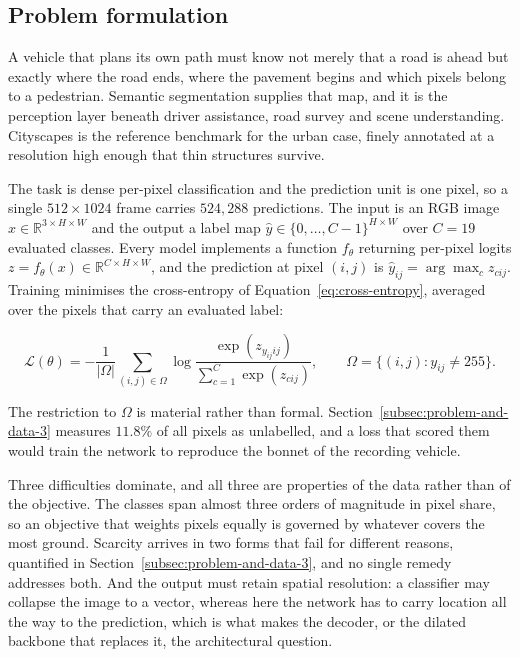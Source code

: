 
\subsection{Problem formulation}
\label{subsec:problem-and-data-1}

A vehicle that plans its own path must know not merely that a road is ahead but exactly where the
road ends, where the pavement begins and which pixels belong to a pedestrian. Semantic
segmentation supplies that map, and it is the perception layer beneath driver assistance, road
survey and scene understanding. Cityscapes \cite{cordts2016cityscapes} is the reference benchmark
for the urban case, finely annotated at a resolution high enough that thin structures survive.

The task is dense per-pixel classification and the prediction unit is one pixel, so a single
$512 \times 1024$ frame carries $524{,}288$ predictions. The input is an RGB image
$x \in \mathbb{R}^{3 \times H \times W}$ and the output a label map
$\hat{y} \in \{0, \dots, C-1\}^{H \times W}$ over $C = 19$ evaluated classes. Every model
implements a function $f_\theta$ returning per-pixel logits
$z = f_\theta(x) \in \mathbb{R}^{C \times H \times W}$, and the prediction at pixel $(i,j)$ is
$\hat{y}_{ij} = \arg\max_{c} z_{cij}$. Training minimises the cross-entropy of
Equation~\ref{eq:cross-entropy}, averaged over the pixels that carry an evaluated label:

\begin{equation}
    \mathcal{L}(\theta) = -\frac{1}{|\Omega|} \sum_{(i,j) \in \Omega}
    \log \frac{\exp(z_{y_{ij} i j})}{\sum_{c=1}^{C} \exp(z_{cij})},
    \qquad
    \Omega = \{(i,j) : y_{ij} \neq 255\}.
    \label{eq:cross-entropy}
\end{equation}

The restriction to $\Omega$ is material rather than formal. Section~\ref{subsec:problem-and-data-3} measures
$11.8\%$ of all pixels as unlabelled, and a loss that scored them would train the network to
reproduce the bonnet of the recording vehicle.

Three difficulties dominate, and all three are properties of the data rather than of the
objective. The classes span almost three orders of magnitude in pixel share, so an objective
that weights pixels equally is governed by whatever covers the most ground. Scarcity arrives in
two forms that fail for different reasons, quantified in
Section~\ref{subsec:problem-and-data-3}, and no single remedy addresses both. And the output must
retain spatial resolution: a classifier may collapse the image to a vector, whereas here the
network has to carry location all the way to the prediction, which is what makes the decoder, or
the dilated backbone that replaces it, the architectural question.

